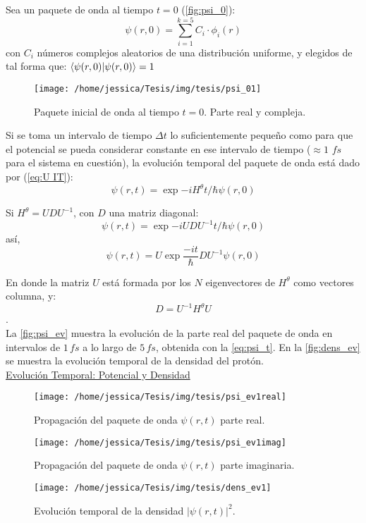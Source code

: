 Sea un paquete de onda al tiempo $t=0$ (\autoref{fig:psi_0}): 
\begin{equation}
  \label{eq:psi_0}
\psi(r,0)=\sum_{i=1}^{k=5}C_i \cdot \phi_{i}(r)
\end{equation}
con $C_i$ números complejos aleatorios de una distribución uniforme, y elegidos de tal forma que: $\bra{\psi(r,0)}\ket{\psi(r,0)}=1$
\begin{figure}[!htbp]
  \centering
  \texttt{[image: /home/jessica/Tesis/img/tesis/psi\_01]}
  \caption{Paquete inicial de onda al tiempo $t=0$. Parte real y compleja.}
  \label{fig:psi_0}
\end{figure}

Si se toma un intervalo de tiempo $\Delta t$ lo suficientemente pequeño como para que el potencial se pueda considerar constante en ese intervalo de tiempo ($\approx 1\,\,fs$ para el sistema en cuestión), la evolución temporal del paquete de onda está dado por (\autoref{eq:U IT}):
\begin{equation}
  \label{eq:wp_ev}
  \psi(r,t)=\exp{-iH^{\theta}t/\hbar}\psi(r,0)
\end{equation}

Si $H^{\theta} = UDU^{-1}$, con $D$ una matriz diagonal:
$$ \psi(r,t) = \exp{-iUDU^{-1}t/\hbar}\psi(r,0)$$  
así,
\begin{equation}
  \label{eq:psi_t}
\psi(r,t) = U\exp{\frac{-it}{\hbar}D}U^{-1}\psi(r,0)
\end{equation}

En donde la matriz $U$ está formada por los $N$ eigenvectores de $H^{\theta}$ como vectores columna, y:
$$D=U^{-1}H^{\theta}U$$.
\\

La \autoref{fig:psi_ev} muestra la evolución de la parte real del paquete de onda en intervalos de $1\,fs$ a lo largo de $5\,fs$, obtenida con la \autoref{eq:psi_t}. En la \autoref{fig:dens_ev} se muestra la evolución temporal de la densidad del protón.\\
\href{https://github.com/Jessi-MM/PropagatorLearning/blob/main/src/Animacion/gifs/animation-dens\%26pot.gif}{\faPlayCircle[regular] Evolución Temporal: Potencial y Densidad}

\begin{figure}[!htbp]
  \centering
  \texttt{[image: /home/jessica/Tesis/img/tesis/psi\_ev1real]}
  \caption{Propagación del paquete de onda $\psi(r,t)$ parte real.}
  \label{fig:psi_evre}
\end{figure}

\begin{figure}[!htbp]
  \centering
  \texttt{[image: /home/jessica/Tesis/img/tesis/psi\_ev1imag]}
  \caption{Propagación del paquete de onda $\psi(r,t)$ parte imaginaria.}
  \label{fig:psi_evim}
\end{figure}

\begin{figure}[!htbp]
  \centering
  \texttt{[image: /home/jessica/Tesis/img/tesis/dens\_ev1]}
  \caption{Evolución temporal de la densidad $|\psi(r,t)|^2$.}
  \label{fig:dens_ev}
\end{figure}
